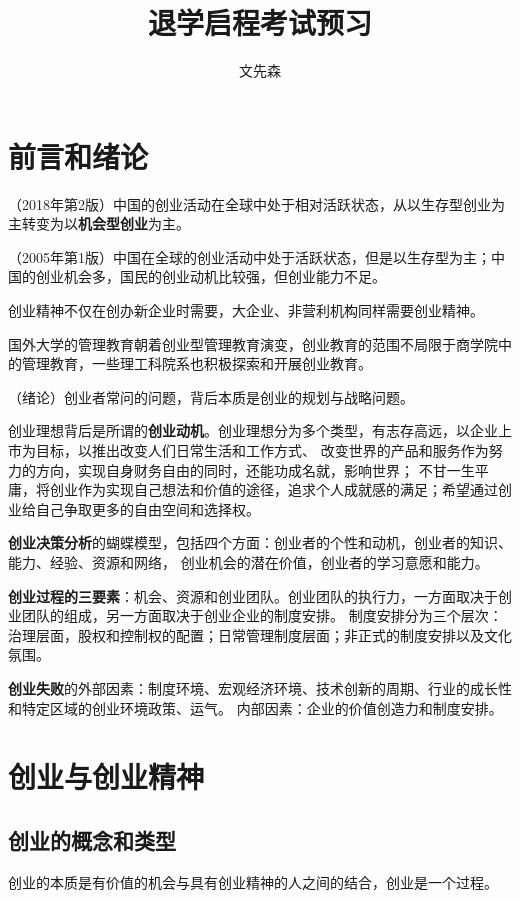 \documentclass[a4paper, UTF8]{ctexart}
\title{\huge{\heiti 退学启程考试预习}}
\author{文先森}
\date{}
\begin{document}
\maketitle

\section{前言和绪论}
		（2018年第2版）中国的创业活动在全球中处于相对活跃状态，从以生存型创业为主转变为以\textbf{机会型创业}为主。

		（2005年第1版）中国在全球的创业活动中处于活跃状态，但是以生存型为主；中国的创业机会多，国民的创业动机比较强，但创业能力不足。

		创业精神不仅在创办新企业时需要，大企业、非营利机构同样需要创业精神。

		国外大学的管理教育朝着创业型管理教育演变，创业教育的范围不局限于商学院中的管理教育，一些理工科院系也积极探索和开展创业教育。

		（绪论）创业者常问的问题，背后本质是创业的规划与战略问题。

		创业理想背后是所谓的\textbf{创业动机}。创业理想分为多个类型，有志存高远，以企业上市为目标，以推出改变人们日常生活和工作方式、
		改变世界的产品和服务作为努力的方向，实现自身财务自由的同时，还能功成名就，影响世界；
		不甘一生平庸，将创业作为实现自己想法和价值的途径，追求个人成就感的满足；希望通过创业给自己争取更多的自由空间和选择权。

		\textbf{创业决策分析}的蝴蝶模型，包括四个方面：创业者的个性和动机，创业者的知识、能力、经验、资源和网络，
		创业机会的潜在价值，创业者的学习意愿和能力。

		\textbf{创业过程的三要素}：机会、资源和创业团队。创业团队的执行力，一方面取决于创业团队的组成，另一方面取决于创业企业的制度安排。
		制度安排分为三个层次：治理层面，股权和控制权的配置；日常管理制度层面；非正式的制度安排以及文化氛围。

		\textbf{创业失败}的外部因素：制度环境、宏观经济环境、技术创新的周期、行业的成长性和特定区域的创业环境政策、运气。
		内部因素：企业的价值创造力和制度安排。

\section{创业与创业精神}
	\subsection{创业的概念和类型}
		创业的本质是有价值的机会与具有创业精神的人之间的结合，创业是一个过程。
\end{document}
